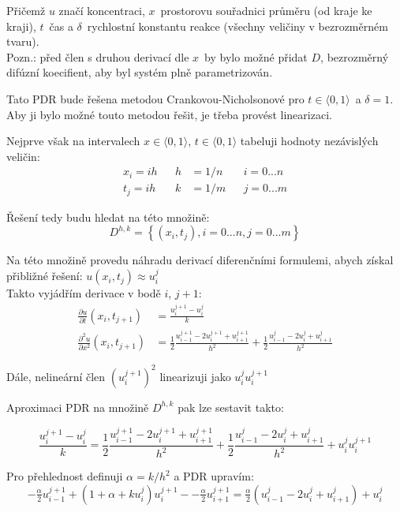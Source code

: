 \documentclass[a4paper,12pt]{article}
\begin{document}
Přičemž $u$ značí koncentraci, $x$~prostorovu souřadnici průměru (od kraje ke kraji), $t$~čas a $\delta$~rychlostní konstantu reakce (všechny veličiny v bezrozměrném tvaru).\\
Pozn.: před člen s druhou derivací dle $x$~by bylo možné přidat $D$, bezrozměrný difúzní koecifient, aby byl systém plně parametrizován.

Tato PDR bude řešena metodou Crankovou-Nicholsonové pro $t \in \langle0, 1\rangle$~a $\delta = 1$.
Aby ji bylo možné touto metodou řešit, je třeba provést linearizaci.

Nejprve však na intervalech $x \in \langle0, 1\rangle$, $t \in \langle0, 1\rangle$ tabeluji hodnoty nezávislých veličin:
\begin{align}
	x_i = i h && h &= 1/n && i = 0...n
	\\
	t_j = i h && k &= 1/m && j = 0...m
\end{align}

Řešení tedy budu hledat na této množině:
\begin{equation}
	D^{h,k} = \left\{ (x_i, t_j), i = 0...n, j = 0...m \right\}
\end{equation}

Na této množině provedu náhradu derivací diferenčními formulemi, abych získal přibližné řešení: $u(x_i, t_j) \approx u_i^j$ \\
Takto vyjádřím derivace v bodě $i$, $j+1$:
\begin{align}
	\frac{\partial u}{\partial t}(x_i, t_{j+1}) &=
	\frac{u_i^{j+1} - u_i^j}{k}
	\\
	\frac{\partial^2 u}{\partial x^2}(x_i, t_{j+1}) &=
	\frac{1}{2} \frac{u_{i-1}^{j+1} - 2 u_i^{j+1} + u_{i+1}^{j+1}}{h^2} +
	\frac{1}{2} \frac{u_{i-1}^j - 2 u_i^j + u_{i+1}^j}{h^2}
\end{align}

Dále, nelineární člen $(u_{i}^{j+1})^2$ linearizuji jako $u_{i}^{j} u_{i}^{j+1}$

Aproximaci PDR na množině $D^{h,k}$ pak lze sestavit takto:

\begin{equation}
	\frac{u_i^{j+1} - u_i^j}{k} =
	\frac{1}{2} \frac{u_{i-1}^{j+1} - 2 u_i^{j+1} + u_{i+1}^{j+1}}{h^2} +
	\frac{1}{2} \frac{u_{i-1}^j - 2 u_i^j + u_{i+1}^j}{h^2} +
	u_{i}^{j} u_{i}^{j+1}
\end{equation}

Pro přehlednost definuji $\alpha = k / h^2$ a PDR upravím:
\begin{equation}
\label{apxPDR}
	-\tfrac{\alpha}{2} u_{i-1}^{j+1} +
	(1 + \alpha + k u_i^j) u_i^{j+1} -
	-\tfrac{\alpha}{2} u_{i+1}^{j+1} =
	\tfrac{\alpha}{2} \left( u_{i-1}^j - 2 u_i^j + u_{i+1}^j \right) + u_i^j
\end{equation}
\end{document}
